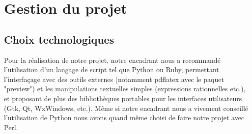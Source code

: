 \documentclass[a4paper]{report}
\begin{document}
  \chapter {Gestion du projet}

  \section{Choix technologiques}
  Pour la réalisation de notre projet, notre encadrant nous a recommandé l'utilisation d'un langage de script tel que Python ou Ruby, permettant l'interfaçage avec des outils externes (notamment pdflatex avec le paquet "preview") et les manipulations textuelles simples (expressions rationnelles etc.), et proposant de plus des bibliothèques portables pour les interfaces utilisateurs (Gtk, Qt, WxWindows, etc.). Même si notre encadrant nous a vivement conseillé l'utilisation de Python nous avons quand même choisi de faire notre projet avec Perl. 
\end{document}
